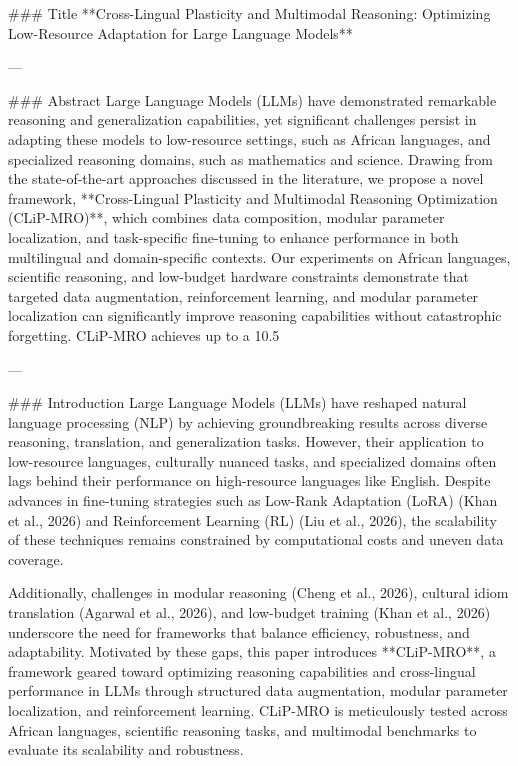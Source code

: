 ### Title
**Cross-Lingual Plasticity and Multimodal Reasoning: Optimizing Low-Resource Adaptation for Large Language Models**

---

### Abstract
Large Language Models (LLMs) have demonstrated remarkable reasoning and generalization capabilities, yet significant challenges persist in adapting these models to low-resource settings, such as African languages, and specialized reasoning domains, such as mathematics and science. Drawing from the state-of-the-art approaches discussed in the literature, we propose a novel framework, **Cross-Lingual Plasticity and Multimodal Reasoning Optimization (CLiP-MRO)**, which combines data composition, modular parameter localization, and task-specific fine-tuning to enhance performance in both multilingual and domain-specific contexts. Our experiments on African languages, scientific reasoning, and low-budget hardware constraints demonstrate that targeted data augmentation, reinforcement learning, and modular parameter localization can significantly improve reasoning capabilities without catastrophic forgetting. CLiP-MRO achieves up to a 10.5%

---

### Introduction
Large Language Models (LLMs) have reshaped natural language processing (NLP) by achieving groundbreaking results across diverse reasoning, translation, and generalization tasks. However, their application to low-resource languages, culturally nuanced tasks, and specialized domains often lags behind their performance on high-resource languages like English. Despite advances in fine-tuning strategies such as Low-Rank Adaptation (LoRA) (Khan et al., 2026) and Reinforcement Learning (RL) (Liu et al., 2026), the scalability of these techniques remains constrained by computational costs and uneven data coverage.

Additionally, challenges in modular reasoning (Cheng et al., 2026), cultural idiom translation (Agarwal et al., 2026), and low-budget training (Khan et al., 2026) underscore the need for frameworks that balance efficiency, robustness, and adaptability. Motivated by these gaps, this paper introduces **CLiP-MRO**, a framework geared toward optimizing reasoning capabilities and cross-lingual performance in LLMs through structured data augmentation, modular parameter localization, and reinforcement learning. CLiP-MRO is meticulously tested across African languages, scientific reasoning tasks, and multimodal benchmarks to evaluate its scalability and robustness.

